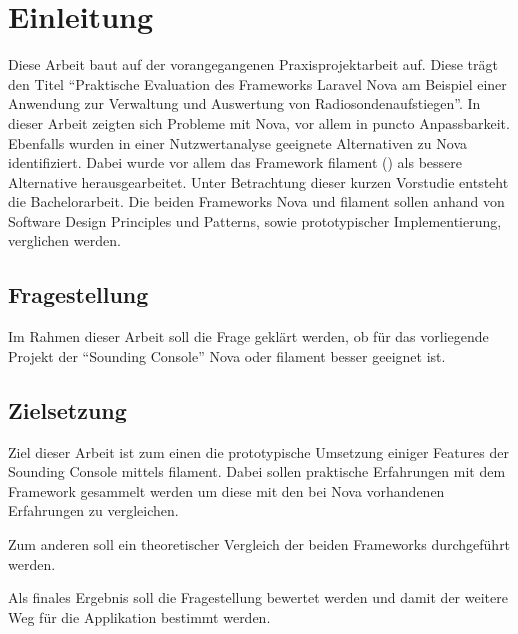 \section{Einleitung}

Diese Arbeit baut auf der vorangegangenen Praxisprojektarbeit auf.
Diese trägt den Titel \enquote{Praktische Evaluation des Frameworks Laravel Nova am Beispiel einer Anwendung zur Verwaltung und Auswertung von Radiosondenaufstiegen}.
In dieser Arbeit zeigten sich Probleme mit Nova, vor allem in puncto Anpassbarkeit.
Ebenfalls wurden in einer Nutzwertanalyse geeignete Alternativen zu Nova identifiziert.
Dabei wurde vor allem das Framework filament (\cite{filament}) als bessere Alternative herausgearbeitet.
Unter Betrachtung dieser kurzen Vorstudie entsteht die Bachelorarbeit.
Die beiden Frameworks Nova und filament sollen anhand von Software Design Principles und Patterns, sowie prototypischer Implementierung, verglichen werden.

\subsection{Fragestellung}
Im Rahmen dieser Arbeit soll die Frage geklärt werden, ob für das vorliegende Projekt der \enquote{Sounding Console} Nova oder filament besser geeignet ist.

\subsection{Zielsetzung}
Ziel dieser Arbeit ist zum einen die prototypische Umsetzung einiger Features der Sounding Console mittels filament.
Dabei sollen praktische Erfahrungen mit dem Framework gesammelt werden um diese mit den bei Nova vorhandenen Erfahrungen zu vergleichen.

Zum anderen soll ein theoretischer Vergleich der beiden Frameworks durchgeführt werden.

Als finales Ergebnis soll die Fragestellung bewertet werden und damit der weitere Weg für die Applikation bestimmt werden.

